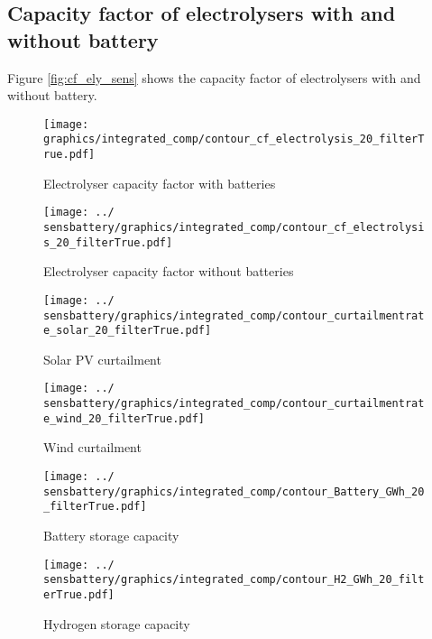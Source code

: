 \subsection{Capacity factor of electrolysers with and without battery}
Figure \ref{fig:cf_ely_sens} shows the capacity factor of electrolysers with and without battery.

\begin{figure*}[h] 
    \centering
    \begin{subfigure}[b]{0.45\linewidth}
        \centering
        \texttt{[image: graphics/integrated\_comp/contour\_cf\_electrolysis\_20\_filterTrue.pdf]}
        \caption{Electrolyser capacity factor with batteries}
        \label{fig:ely_cf}
    \end{subfigure}
    \hfill
    \begin{subfigure}[b]{0.45\linewidth}
        \centering
        \texttt{[image: ../\\sensbattery/graphics/integrated\_comp/contour\_cf\_electrolysis\_20\_filterTrue.pdf]}
        \caption{Electrolyser capacity factor without batteries}
        \label{fig:ely_cf_nobat}
    \end{subfigure}
    \hfill

    \caption{Capacity Factor (CF) of electrolysers with and without batteries.}
    \label{fig:cf_ely_sens}
\end{figure*}



\begin{figure*}[h] %
    \centering
    \begin{subfigure}[b]{0.45\linewidth}
        \centering
        \texttt{[image: ../\\sensbattery/graphics/integrated\_comp/contour\_curtailmentrate\_solar\_20\_filterTrue.pdf]}
        \caption{Solar PV curtailment}
        \label{fig:solar_curt}
    \end{subfigure}
    \hfill
    \begin{subfigure}[b]{0.45\linewidth}
        \centering
        \texttt{[image: ../\\sensbattery/graphics/integrated\_comp/contour\_curtailmentrate\_wind\_20\_filterTrue.pdf]}
        \caption{Wind curtailment}
        \label{fig:wind_curt}
    \end{subfigure}
    \hfill
    \begin{subfigure}[b]{0.45\linewidth}
        \centering
        \texttt{[image: ../\\sensbattery/graphics/integrated\_comp/contour\_Battery\_GWh\_20\_filterTrue.pdf]}
        \caption{Battery storage capacity}
        \label{fig:battery_cap}
    \end{subfigure}
    \hfill
    \begin{subfigure}[b]{0.45\linewidth}
        \centering
        \texttt{[image: ../\\sensbattery/graphics/integrated\_comp/contour\_H2\_GWh\_20\_filterTrue.pdf]}
        \caption{Hydrogen storage capacity}
        \label{fig:hystorage_cap}
    \end{subfigure}
    \hfill

    \caption{Scenario no batteries: Curtailment rates and storage capacities}
    \label{fig:integration_options_nobat}
\end{figure*}


\clearpage